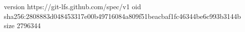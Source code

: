 version https://git-lfs.github.com/spec/v1
oid sha256:2808883d048453317e00b49716084a809f51beacbaf1fc46344be6c993b3144b
size 2796344
